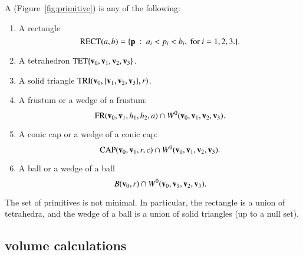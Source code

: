\begin{definition}[primitive]\label{def:primitive} 
A  (Figure~\ref{fig:primitive}) is any of the following:

\begin{enumerate}%
\item A rectangle 
\[ 
{\operatorname{RECT}}(a,b)=\{{\mathbf p} \ :\  a_i < p_i < b_i,\text { for } i=1,2,3.\}.
\] 
\item A tetrahedron ${\operatorname{TET}}\{{\mathbf v}_0,{\mathbf v}_1,{\mathbf v}_2,{\mathbf v}_3\}$.
\item A solid triangle ${\operatorname{TRI}}({\mathbf v}_0,\{{\mathbf v}_1,{\mathbf v}_2,{\mathbf v}_3\},r)$.
%
\item A frustum or a wedge of a frustum:
\[ 
{\operatorname{FR}}({\mathbf v}_0,{\mathbf v}_1,h_1,h_2,a) \cap W^0({\mathbf v}_0,{\mathbf v}_1,{\mathbf v}_2,{\mathbf v}_3).
\] 
\item A conic cap or a wedge of a conic cap: 
\[ 
{\operatorname{CAP}}({\mathbf v}_0,{\mathbf v}_1,r,c) \cap W^0({\mathbf v}_0,{\mathbf v}_1,{\mathbf v}_2,{\mathbf v}_3).
\] 
\item A ball or a wedge of a ball
\[ 
B({\mathbf v}_0,r) \cap W^0({\mathbf v}_0,{\mathbf v}_1,{\mathbf v}_2,{\mathbf v}_3).
\] 
%
%
%
%
%
%
%
\label{enum:volume-prim}
\end{enumerate}
The set of primitives is not minimal.  In particular, the
rectangle is a union of tetrahedra, and the wedge of a ball is a union of
solid triangles (up to a null set).

\end{definition}

\subsection{volume calculations}\label{sec:primitive}

